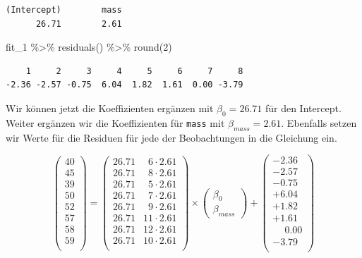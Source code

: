 \documentclass[
  letterpaper,
]{scrbook}
\newenvironment{Shaded}{\begin{snugshade}}{\end{snugshade}}
\newcommand{\DecValTok}[1]{\textcolor[rgb]{0.68,0.00,0.00}{#1}}
\newcommand{\FunctionTok}[1]{\textcolor[rgb]{0.28,0.35,0.67}{#1}}
\newcommand{\NormalTok}[1]{\textcolor[rgb]{0.00,0.23,0.31}{#1}}
\newcommand{\SpecialCharTok}[1]{\textcolor[rgb]{0.37,0.37,0.37}{#1}}
\begin{document}
\begin{verbatim}
(Intercept)        mass 
      26.71        2.61 
\end{verbatim}

\begin{Shaded}
\begin{Highlighting}[]
\NormalTok{fit\_1 }\SpecialCharTok{\%\textgreater{}\%} \FunctionTok{residuals}\NormalTok{() }\SpecialCharTok{\%\textgreater{}\%} \FunctionTok{round}\NormalTok{(}\DecValTok{2}\NormalTok{)}
\end{Highlighting}
\end{Shaded}

\begin{verbatim}
    1     2     3     4     5     6     7     8 
-2.36 -2.57 -0.75  6.04  1.82  1.61  0.00 -3.79 
\end{verbatim}

Wir können jetzt die Koeffizienten ergänzen mit \(\beta_0 = 26.71\) für
den Intercept. Weiter ergänzen wir die Koeffizienten für \texttt{mass}
mit \(\beta_{mass}=2.61\). Ebenfalls setzen wir Werte für die Residuen
für jede der Beobachtungen in die Gleichung ein.

\[
 \begin{pmatrix}
  40 \\
  45 \\
  39 \\
  50 \\
  52 \\
  57 \\
  58 \\
  59 \\
 \end{pmatrix}
 =
  \begin{pmatrix}
  26.71 & \phantom{0}6 \cdot 2.61\\
  26.71 & \phantom{0}8 \cdot 2.61\\
  26.71 & \phantom{0}5 \cdot 2.61\\
  26.71 & \phantom{0}7 \cdot 2.61\\
  26.71 & \phantom{0}9 \cdot 2.61\\
  26.71 & 11\cdot 2.61\\
  26.71 & 12\cdot 2.61\\
  26.71 & 10\cdot 2.61\\
 \end{pmatrix}
 \times
  \begin{pmatrix}
  \beta_0 \\
  \beta_{mass} 
 \end{pmatrix} +
  \begin{pmatrix}
  -2.36\\
  -2.57\\
  -0.75 \\
  +6.04\\
  +1.82\\
  +1.61\\
  \phantom{+}0.00\\
  -3.79\\
 \end{pmatrix}
\]
\end{document}
